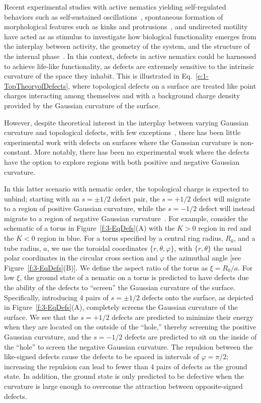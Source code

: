 Recent experimental studies with active nematics yielding self-regulated behaviors such as self-sustained oscillations~\cite{RN9}, spontaneous formation of morphological features such as kinks and protrusions~\cite{RN9,RN3}, and undirected motility~\cite{RN9,RN3} have acted as as stimulus to investigate how biological functionality emerges from the interplay between activity, the geometry of the system, and the structure of the internal phase~\cite{RN160,RN51,RN10}.
In this context, defects in active nematics could be harnessed to achieve life-like functionality, as defects are extremely sensitive to the intrinsic curvature of the space they inhabit.
This is illustrated in Eq.~\ref{e:1-TopTheoryofDefects}, where topological defects on a surface are treated like point charges interacting among themselves and with a background charge density provided by the Gaussian curvature of the surface.

However, despite theoretical interest in the interplay between varying Gaussian curvature and topological defects, with few exceptions~\cite{RN84,RN25,RN73,RN81}, there has been little experimental work with defects on surfaces where the Gaussian curvature is non-constant.
More notably, there has been no experimental work where the defects have the option to explore regions with both positive and negative Gaussian curvature.

In this latter scenario with nematic order, the topological charge is expected to unbind; starting with an $s = \pm 1/2$ defect pair, the $s = +1/2$ defect will migrate to a region of positive Gaussian curvature, while the $s=  -1/2$ defect will instead migrate to a region of negative Gaussian curvature~\cite{RN17,RN19,RN22}.
For example, consider the schematic of a torus in Figure~\ref{f:3-EqDefs}(A) with the $K>0$ region in red and the $K<0$ region in blue.
For a torus specified by a central ring radius, $R_0$, and a tube radius, $a$, we use the toroidal coordinates $\{r,\theta,\varphi\}$, with $\{r,\theta \}$ the usual polar coordinates in the circular cross section and $\varphi$ the azimuthal angle [see Figure~\ref{f:3-EqDefs}(B)].
We define the aspect ratio of the torus as $\xi = R_0/a$.
For low $\xi$, the ground state of a nematic on a torus is predicted to have defects due the ability of the defects to ``screen'' the Gaussian curvature of the surface.
Specifically, introducing 4 pairs of $s = \pm 1/2$ defects onto the surface, as depicted in Figure~\ref{f:3-EqDefs}(A), completely screens the Gaussian curvature of the surface.
We see that the $s = +1/2$ defects are predicted to minimize their energy when they are located on the outside of the ``hole,'' thereby screening the positive Gaussian curvature, and the $s = -1/2$ defects are predicted to sit on the inside of the ``hole'' to screen the negative Gaussian curvature.
The repulsion between the like-signed defects cause the defects to be spaced in intervals of $\varphi = \pi/2$; increasing the repulsion can lead to fewer than 4 pairs of defects as the ground state.
In addition, the ground state is only predicted to be defective when the curvature is large enough to overcome the attraction between opposite-signed defects.

